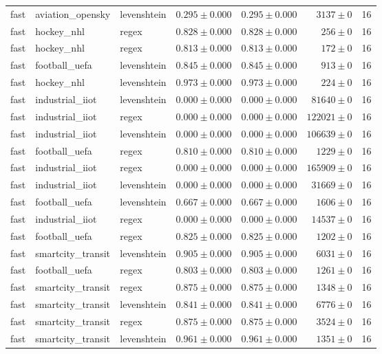 \begin{table}[htbp]
\begin{tabular}{l l l r r r r}
fast & aviation\_opensky & levenshtein & $0.295\pm0.000$ & $0.295\pm0.000$ & $3137\pm0$ & 16 \\
fast & hockey\_nhl & regex & $0.828\pm0.000$ & $0.828\pm0.000$ & $256\pm0$ & 16 \\
fast & hockey\_nhl & regex & $0.813\pm0.000$ & $0.813\pm0.000$ & $172\pm0$ & 16 \\
fast & football\_uefa & levenshtein & $0.845\pm0.000$ & $0.845\pm0.000$ & $913\pm0$ & 16 \\
fast & hockey\_nhl & levenshtein & $0.973\pm0.000$ & $0.973\pm0.000$ & $224\pm0$ & 16 \\
fast & industrial\_iiot & levenshtein & $0.000\pm0.000$ & $0.000\pm0.000$ & $81640\pm0$ & 16 \\
fast & industrial\_iiot & regex & $0.000\pm0.000$ & $0.000\pm0.000$ & $122021\pm0$ & 16 \\
fast & industrial\_iiot & levenshtein & $0.000\pm0.000$ & $0.000\pm0.000$ & $106639\pm0$ & 16 \\
fast & football\_uefa & regex & $0.810\pm0.000$ & $0.810\pm0.000$ & $1229\pm0$ & 16 \\
fast & industrial\_iiot & regex & $0.000\pm0.000$ & $0.000\pm0.000$ & $165909\pm0$ & 16 \\
fast & industrial\_iiot & levenshtein & $0.000\pm0.000$ & $0.000\pm0.000$ & $31669\pm0$ & 16 \\
fast & football\_uefa & levenshtein & $0.667\pm0.000$ & $0.667\pm0.000$ & $1606\pm0$ & 16 \\
fast & industrial\_iiot & regex & $0.000\pm0.000$ & $0.000\pm0.000$ & $14537\pm0$ & 16 \\
fast & football\_uefa & regex & $0.825\pm0.000$ & $0.825\pm0.000$ & $1202\pm0$ & 16 \\
fast & smartcity\_transit & levenshtein & $0.905\pm0.000$ & $0.905\pm0.000$ & $6031\pm0$ & 16 \\
fast & football\_uefa & regex & $0.803\pm0.000$ & $0.803\pm0.000$ & $1261\pm0$ & 16 \\
fast & smartcity\_transit & regex & $0.875\pm0.000$ & $0.875\pm0.000$ & $1348\pm0$ & 16 \\
fast & smartcity\_transit & levenshtein & $0.841\pm0.000$ & $0.841\pm0.000$ & $6776\pm0$ & 16 \\
fast & smartcity\_transit & regex & $0.875\pm0.000$ & $0.875\pm0.000$ & $3524\pm0$ & 16 \\
fast & smartcity\_transit & levenshtein & $0.961\pm0.000$ & $0.961\pm0.000$ & $1351\pm0$ & 16 \\

\end{tabular}
\end{table}
